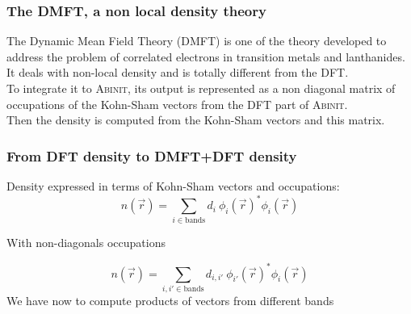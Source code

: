 \begin{frame}
  \frametitle{The DMFT, a non local density theory}
  The Dynamic Mean Field Theory (DMFT) is one of the theory developed
  to address the problem of correlated electrons in transition metals 
  and lanthanides.\\
  It deals with non-local density and is totally different from the DFT.\\
  To integrate it to \textsc{Abinit}, its output is represented as a non
  diagonal matrix of occupations of the Kohn-Sham vectors from the DFT part of \textsc{Abinit}.\\
  Then the density is computed from the Kohn-Sham vectors and this matrix.
\end{frame}

\begin{frame}
  \frametitle{From DFT density to DMFT+DFT density}
  Density expressed in terms of Kohn-Sham vectors and occupations:
  \begin{equation}
    n(\vec{r}) = \sum_{i \in \text{bands}} d_i~\phi_i(\vec{r})^* \phi_i(\vec{r})
  \end{equation}

  With non-diagonals occupations

  \begin{equation}
    n(\vec{r}) = \sum_{i, i' \in \text{bands}} d_{i,i'}~\phi_{i'}(\vec{r})^* \phi_i(\vec{r})
  \end{equation}
  \alert{We have now to compute products of vectors from different bands}
\end{frame}
